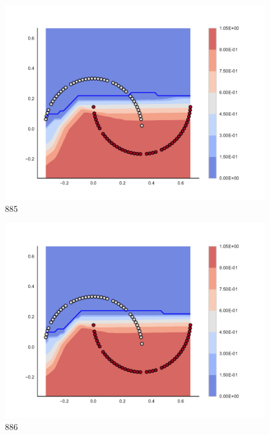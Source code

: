 \begin{subfigure}[b]{0.09\textwidth}
    \includegraphics[clip, trim=2.35cm 1.75cm 4.5cm 0cm,width=\textwidth]{img/convergence/885.pdf}
    \caption{885}
    \label{fig:convergence_885}
\end{subfigure}
%
\begin{subfigure}[b]{0.09\textwidth}
    \includegraphics[clip, trim=2.35cm 1.75cm 4.5cm 0cm,width=\textwidth]{img/convergence/886.pdf}
    \caption{886}
    \label{fig:convergence_886}
\end{subfigure}
%
